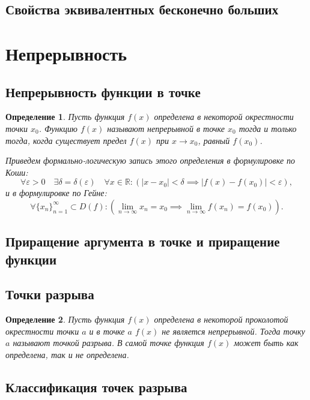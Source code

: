 \documentclass[a4paper,12pt]{article} %
\newtheorem{definition}{Определение}[section]
\theoremstyle{remark}
\theoremstyle{definition}
\begin{document}
\subsection{Свойства эквивалентных бесконечно больших}

\newpage
\section{Непрерывность}
\subsection{Непрерывность функции в точке}
\begin{definition}
	Пусть функция $f(x)$ определена в некоторой окрестности точки $x_0$. Функцию $f(x)$ называют непрерывной в точке $x_0$ тогда и только тогда, когда существует предел $f(x)$ при $x\to x_0$, равный $f(x_0)$.

	Приведем формально-логическую запись этого определения в формулировке по Коши:
	\[
	\forall \varepsilon > 0 \quad \exists \delta=\delta(\varepsilon) \quad \forall  x \in  \mathbb{R} : (|x-x_0| < \delta \implies |f(x) - f(x_0)| < \varepsilon),
	\] 
	и в формулировке по Гейне:
	\[
	\forall \{x_n\}_{n=1}^{\infty} \subset D(f) : (\lim_{n \to \infty} x_n = x_0 \implies \lim_{n \to \infty} f(x_n) = f(x_0))
	.\] 
\end{definition}

\subsection{Приращение аргумента в точке и приращение функции}

\subsection{Точки разрыва}
\begin{definition}
	Пусть функция $f(x)$ определена в некоторой проколотой окрестности точки $a$ и в точке $a$ $f(x)$ не является непрерывной. Тогда точку $a$ называют точкой разрыва. В самой точке функция $f(x)$ может быть как определена, так и не определена.
\end{definition}

\subsection{Классификация точек разрыва}
\end{document}
